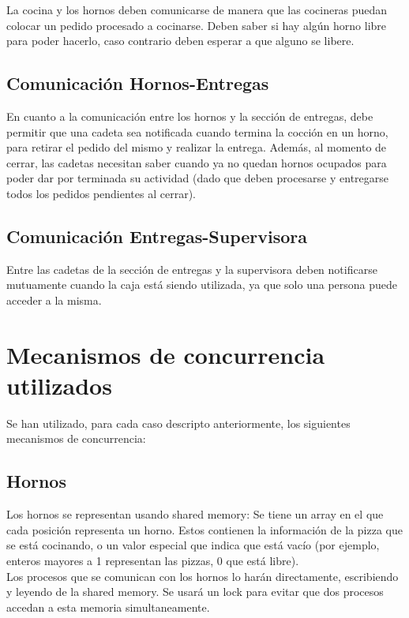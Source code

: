 \documentclass[11pt,spanish,a4paper,openany,notitlepage]{article}
\begin{document}
La cocina y los hornos deben comunicarse de manera que las cocineras puedan colocar un pedido 
procesado a cocinarse. Deben saber si hay algún horno libre para poder hacerlo, caso contrario 
deben esperar a que alguno se libere.

\subsection{Comunicación Hornos-Entregas}

En cuanto a la comunicación entre los hornos y la sección de entregas, debe permitir que una cadeta 
sea notificada cuando termina la cocción en un horno, para retirar el pedido del mismo y realizar 
la entrega. Además, al momento de cerrar, las cadetas necesitan saber cuando ya no quedan hornos 
ocupados para poder dar por terminada su actividad (dado que deben procesarse y entregarse todos 
los pedidos pendientes al cerrar).

\subsection{Comunicación Entregas-Supervisora}

Entre las cadetas de la sección de entregas y la supervisora deben notificarse mutuamente cuando la 
caja está siendo utilizada, ya que solo una persona puede acceder a la misma. 

\section{Mecanismos de concurrencia utilizados}

Se han utilizado, para cada caso descripto anteriormente, los siguientes mecanismos de concurrencia:

\subsection{Hornos}

Los hornos se representan usando shared memory: Se tiene un array en el que cada posición representa 
un horno. Estos contienen la información de la pizza que se está cocinando, o un valor especial que 
indica que está vacío (por ejemplo, enteros mayores a 1 representan las pizzas, 0 que está libre).\\
Los procesos que se comunican con los hornos lo harán directamente, escribiendo y leyendo de la 
shared memory. Se usará un lock para evitar que dos procesos accedan a esta memoria simultaneamente.
\end{document}
